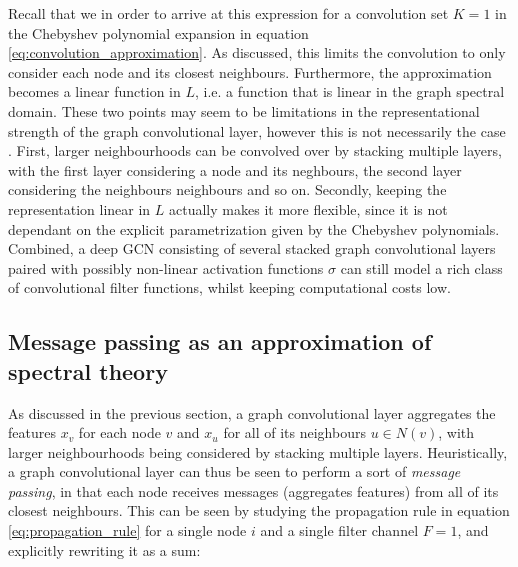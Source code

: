 Recall that we in order to arrive at this expression for a convolution set $K=1$ in the Chebyshev polynomial expansion in equation \eqref{eq:convolution_approximation}. As discussed, this limits the convolution to only consider each node and its closest neighbours. Furthermore, the approximation becomes a linear function in $L$, i.e. a function that is linear in the graph spectral domain. These two points may seem to be limitations in the representational strength of the graph convolutional layer, however this is not necessarily the case \cite{kipf_semi_supervised}. First, larger neighbourhoods can be convolved over by stacking multiple layers, with the first layer considering a node and its neghbours, the second layer considering the neighbours neighbours and so on. Secondly, keeping the representation linear in $L$ actually makes it more flexible, since it is not dependant on the explicit parametrization given by the Chebyshev polynomials. Combined, a deep GCN consisting of several stacked graph convolutional layers paired with possibly non-linear activation functions $\sigma$ can still model a rich class of convolutional filter functions, whilst keeping computational costs low. 


\subsection{Message passing as an approximation of spectral theory}

As discussed in the previous section, a graph convolutional layer aggregates the features $x_v$ for each node $v$ and $x_u$ for all of its neighbours $u \in N(v)$, with larger neighbourhoods being considered by stacking multiple layers. Heuristically, a graph convolutional layer can thus be seen to perform a sort of \textit{message passing}, in that each node receives messages (aggregates features) from all of its closest neighbours. This can be seen by studying the propagation rule in equation \eqref{eq:propagation_rule} for a single node $i$ and a single filter channel $F=1$, and explicitly rewriting it as a sum: 

